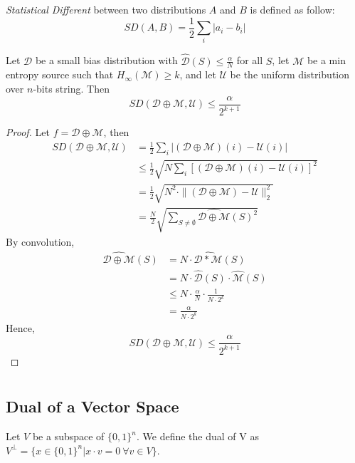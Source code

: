 \begin{definition}
\textit{Statistical Different} between two distributions $A$ and $B$ is defined as follow:
$$SD(A,B) = \frac{1}{2} \sum\limits_{i} |a_i - b_i |$$
\end{definition}
\begin{theorem}
Let $\mathcal{D}$ be a small bias distribution with $\widehat{\mathcal{D}}(S) \leq \frac{\alpha}{N}$ for all $S$, let $\mathcal{M}$ be a min entropy source such that $H_\infty(\mathcal{M}) \geq k$, and let $\mathcal{U}$ be  the uniform distribution over $n$-bits string. Then $$SD(\mathcal{D} \oplus \mathcal{M}, \mathcal{U}) \leq \frac{\alpha}{2^{k+1}}$$
\end{theorem}

\begin{proof} Let $f = \mathcal{D} \oplus \mathcal{M}$, then 
\begin{align*}
SD(\mathcal{D} \oplus \mathcal{M}, \mathcal{U})
&= \frac{1}{2} \sum\limits_i |(\mathcal{D} \oplus \mathcal{M})(i) - \mathcal{U}(i) | \\
& \leq \frac{1}{2}  \sqrt{N \sum\limits_i [(\mathcal{D} \oplus \mathcal{M})(i) - \mathcal{U}(i)]^2} \\
&= \frac{1}{2}  \sqrt{N^2 \cdot \| (\mathcal{D} \oplus \mathcal{M}) - \mathcal{U} \|_2^2} \\
& = \frac{N}{2} \sqrt{\sum\limits_{S \neq \emptyset} 
\widehat{\mathcal{D} \oplus \mathcal{M}}(S)^2}
\end{align*}
By convolution,
\begin{align*}
\widehat{\mathcal{D} \oplus \mathcal{M}}(S) 
&= N \cdot \widehat{\mathcal{D} * \mathcal{M}} (S) \\
&= N \cdot \widehat{\mathcal{D}}(S) \cdot \widehat{\mathcal{M}}(S) \\
& \leq N \cdot \frac{\alpha}{N} \cdot \frac{1}{N \cdot 2^k} \\
&= \frac{\alpha}{N \cdot 2^k}
\end{align*}
Hence, 
$$SD(\mathcal{D} \oplus \mathcal{M}, \mathcal{U}) 
\leq \frac{\alpha}{2^{k+1}} $$
\end{proof}

\appendix

\chapter{}
\section{Dual of a Vector Space}
\begin{definition} 
Let $V$ be a subspace of $\{0,1\}^n$. 
We define the dual of V as 
$V^\perp = \{ x \in \{ 0,1 \}^n | x \cdot v = 0 \ \forall v \in V \}$.
\end{definition}

